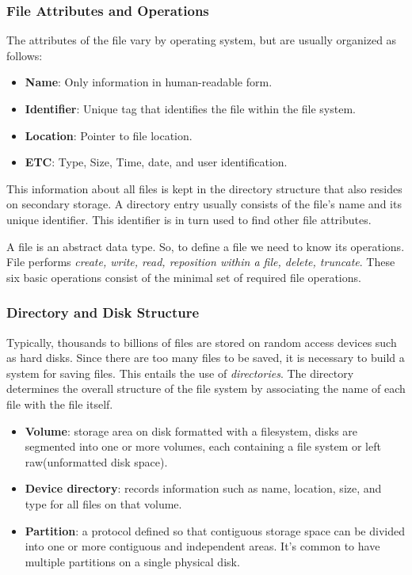 \documentclass{homework}
\begin{document}
\subsubsection{File Attributes and Operations}
The attributes of the file vary by operating system, but are usually organized as follows:
\begin{itemize}
    \item \textbf{Name}: Only information in human-readable form.
    \item \textbf{Identifier}: Unique tag that identifies the file within the file system.
    \item \textbf{Location}: Pointer to file location.
    \item \textbf{ETC}: Type, Size, Time, date, and user identification.
\end{itemize}

This information about all files is kept in the directory structure that also resides on secondary storage. A directory entry usually consists of the file’s name and its unique identifier. This identifier is in turn used to find other file attributes.

A file is an abstract data type. So, to define a file we need to know its operations. File performs \textit{create, write, read, reposition within a file, delete, truncate}. These six basic operations consist of the minimal set of required file operations.

\subsubsection{Directory and Disk Structure}
Typically, thousands to billions of files are stored on random access devices such as hard disks. Since there are too many files to be saved, it is necessary to build a system for saving files. This entails the use of \textit{directories}. The directory determines the overall structure of the file system by associating the name of each file with the file itself.
\begin{itemize}
    \item \textbf{Volume}: storage area on disk formatted with a filesystem, disks are segmented into one or more volumes, each containing a file system or left raw(unformatted disk space).
    \item \textbf{Device directory}: records information such as name, location, size, and type for all files on that volume.
    \item \textbf{Partition}: a protocol defined so that contiguous storage space can be divided into one or more contiguous and independent areas. It's common to have multiple partitions on a single physical disk.
\end{itemize}
\end{document}
